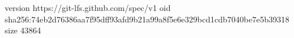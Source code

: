version https://git-lfs.github.com/spec/v1
oid sha256:74eb2d76386aa7f95dff93afd9b21a99a8f5e6e329bcd1cdb7040be7e5b39318
size 43864
